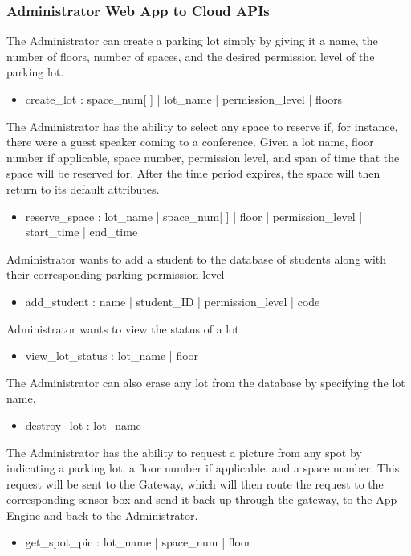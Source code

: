 \documentclass[paper=a4, fontsize=12pt]{scrartcl}
\numberwithin{equation}{section}		%
\numberwithin{figure}{section}			%
\numberwithin{table}{section}				%
\begin{document}
\subsubsection{Administrator Web App to Cloud APIs} \label{cloudAdminAPIs}
The Administrator can create a parking lot simply by giving it a name, the number of floors, number of spaces, and the desired permission level of the parking lot.
\begin{itemize}
  \item create\_lot : space\_num[ ] | lot\_name | permission\_level | floors
  \end{itemize}
The Administrator has the ability to select any space to reserve if, for instance, there were a guest speaker coming to a conference. Given a lot name, floor number if applicable, space number, permission level, and span of time that the space will be reserved for. After the time period expires, the space will then return to its default attributes. 
\begin{itemize}
  \item reserve\_space : lot\_name | space\_num[ ] | floor | permission\_level | start\_time | end\_time
  \end{itemize}
Administrator wants to add a student to the database of students along with their corresponding parking permission level
\begin{itemize}
  \item add\_student : name | student\_ID | permission\_level | code
  \end{itemize}
Administrator wants to view the status of a lot
\begin{itemize}
  \item view\_lot\_status : lot\_name | floor
  \end{itemize}
The Administrator can also erase any lot from the database by specifying the lot name. 
\begin{itemize}
  \item destroy\_lot : lot\_name
  \end{itemize}
The Administrator has the ability to request a picture from any spot by indicating a parking lot, a floor number if applicable, and a space number. This request will be sent to the Gateway, which will then route the request to the corresponding sensor box and send it back up through the gateway, to the App Engine and back to the Administrator. 
\begin{itemize}
  \item get\_spot\_pic : lot\_name | space\_num | floor
  \end{itemize}
\end{document}
